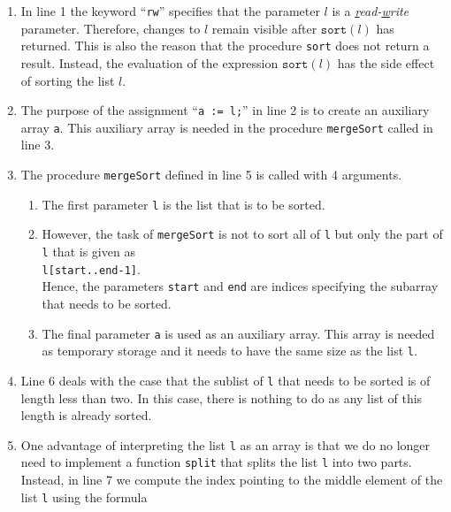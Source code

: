 \begin{enumerate}
\item In line 1 the keyword ``\texttt{rw}'' specifies that the parameter $l$ is a
      \emph{\underline{r}ead-\underline{w}rite} parameter.  Therefore, changes to $l$ remain
      visible after $\texttt{sort}(l)$ has returned.  This is also the reason that the procedure 
      \texttt{sort} does not return a result.  Instead, the evaluation of the expression
      $\mathtt{sort}(l)$ has the side effect of sorting the list $l$.
\item The purpose of the assignment ``\texttt{a := l;}'' in line 2 is to create an auxiliary array
      \texttt{a}.  This auxiliary array is needed in the procedure
      \texttt{mergeSort} called in line 3.
\item The procedure \texttt{mergeSort} defined in line 5 is called with 4 arguments.
      \begin{enumerate}
      \item The first parameter \texttt{l} is the list that is to be sorted.
      \item However, the task of \texttt{mergeSort} is not to sort all of \texttt{l} but only
            the part of \texttt{l} that is given as
            \\[0.2cm]
            \hspace*{1.3cm} 
            \texttt{l[start..end-1]}. 
            \\[0.2cm]
            Hence, the parameters \texttt{start} and \texttt{end} are indices specifying the 
            subarray that needs to be sorted.
      \item The final parameter \texttt{a} is used as an auxiliary array.  This array is needed
            as temporary storage and it needs to have the same size as the list \texttt{l}.
      \end{enumerate} 
\item Line 6 deals with the case that the sublist of \texttt{l} that needs to be sorted is of length
      less than two.  In this case, there is nothing to do as any list of this length is already sorted.
\item One advantage of interpreting the list \texttt{l} as an array is that we do no longer
      need to implement a function \texttt{split} that splits the list \texttt{l} into two parts. 
      Instead, in line 7 we compute the index pointing to the middle element of the list \texttt{l} using the
      formula \\[0.2cm]
      \hspace*{1.3cm} 

\end{enumerate}
